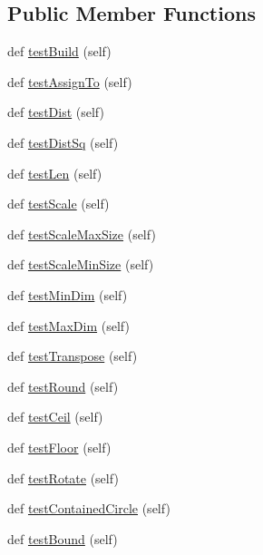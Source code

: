 \subsection*{Public Member Functions}
\begin{DoxyCompactItemize}
\item 
def \mbox{\hyperlink{classpysc2_1_1lib_1_1point__test_1_1_point_test_ad12a19dcb832316fa8d1f886a7170ee3}{test\+Build}} (self)
\item 
def \mbox{\hyperlink{classpysc2_1_1lib_1_1point__test_1_1_point_test_a437c584557a8bd89608f4d2b7031772d}{test\+Assign\+To}} (self)
\item 
def \mbox{\hyperlink{classpysc2_1_1lib_1_1point__test_1_1_point_test_a859a1f0935cc6fb30847cce427f8e86c}{test\+Dist}} (self)
\item 
def \mbox{\hyperlink{classpysc2_1_1lib_1_1point__test_1_1_point_test_aea852a2f277b80c7ce0284529566d060}{test\+Dist\+Sq}} (self)
\item 
def \mbox{\hyperlink{classpysc2_1_1lib_1_1point__test_1_1_point_test_a30da6dc96b15c2ca483ee8fa9f523547}{test\+Len}} (self)
\item 
def \mbox{\hyperlink{classpysc2_1_1lib_1_1point__test_1_1_point_test_ab3fac4980cacfe3de6798039647a1e57}{test\+Scale}} (self)
\item 
def \mbox{\hyperlink{classpysc2_1_1lib_1_1point__test_1_1_point_test_ad83d5d0d2bd253f254e7f88c2267f9b1}{test\+Scale\+Max\+Size}} (self)
\item 
def \mbox{\hyperlink{classpysc2_1_1lib_1_1point__test_1_1_point_test_a4a1bbfdbfcb124ef6711f9f80e74751d}{test\+Scale\+Min\+Size}} (self)
\item 
def \mbox{\hyperlink{classpysc2_1_1lib_1_1point__test_1_1_point_test_ad410f51e3943e335b48988c43ae29292}{test\+Min\+Dim}} (self)
\item 
def \mbox{\hyperlink{classpysc2_1_1lib_1_1point__test_1_1_point_test_a02721028156d77d78a3b40b0f4728f17}{test\+Max\+Dim}} (self)
\item 
def \mbox{\hyperlink{classpysc2_1_1lib_1_1point__test_1_1_point_test_af76618e86853e5aaa46189849b05fba8}{test\+Transpose}} (self)
\item 
def \mbox{\hyperlink{classpysc2_1_1lib_1_1point__test_1_1_point_test_ad68fffc4b5078c5994109db0e261929e}{test\+Round}} (self)
\item 
def \mbox{\hyperlink{classpysc2_1_1lib_1_1point__test_1_1_point_test_a17b74dbbc38f4de18338b1ac5c3345cc}{test\+Ceil}} (self)
\item 
def \mbox{\hyperlink{classpysc2_1_1lib_1_1point__test_1_1_point_test_a078ea743680d548a84054a49214c750b}{test\+Floor}} (self)
\item 
def \mbox{\hyperlink{classpysc2_1_1lib_1_1point__test_1_1_point_test_ae34b180630e932d59d61d7c0925473c5}{test\+Rotate}} (self)
\item 
def \mbox{\hyperlink{classpysc2_1_1lib_1_1point__test_1_1_point_test_a7b34a7d475a708d56c3f8e42643a6eea}{test\+Contained\+Circle}} (self)
\item 
def \mbox{\hyperlink{classpysc2_1_1lib_1_1point__test_1_1_point_test_ae45d018988b644631a6be793de0a07a9}{test\+Bound}} (self)
\end{DoxyCompactItemize}



